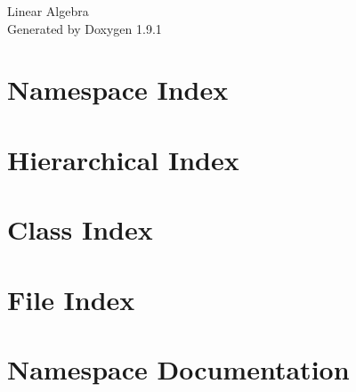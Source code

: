 \let\mypdfximage\pdfximage\def\pdfximage{\immediate\mypdfximage}\documentclass[twoside]{book}
\newcommand{\+}{\discretionary{\mbox{\scriptsize$\hookleftarrow$}}{}{}}
\newcommand{\clearemptydoublepage}{%
  \newpage{\pagestyle{empty}\cleardoublepage}%
}
\begin{document}
\raggedbottom

\hypersetup{pageanchor=false,
             bookmarksnumbered=true,
             pdfencoding=unicode
            }
\begin{titlepage}
\vspace*{7cm}
\begin{center}%
{\Large Linear Algebra }\\
\vspace*{1cm}
{\large Generated by Doxygen 1.9.1}\\
\end{center}
\end{titlepage}
\clearemptydoublepage
{}
\tableofcontents
\clearemptydoublepage
{}
\hypersetup{pageanchor=true}

\chapter{Namespace Index}

\chapter{Hierarchical Index}

\chapter{Class Index}

\chapter{File Index}

\chapter{Namespace Documentation}








\end{document}
